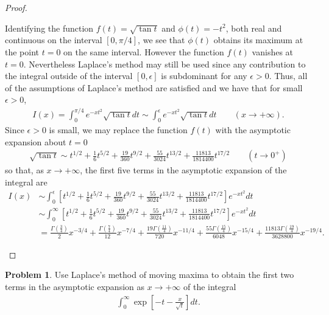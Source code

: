 \documentclass[12pt]{article}
\theoremstyle{definition}
\newtheorem{problem}{Problem}
\begin{document}
\begin{proof}
\begin{enumerate}
      Identifying the function $f(t) = \sqrt{\tan t}$ and $\phi(t) = -t^2$,
      both real and continuous on the interval $[0, \pi/4]$, we see that $\phi(t)$
      obtains its maximum at the point $t = 0$ on the same interval. However the function $f(t)$ vanishes at $t=0$.
      Nevertheless Laplace's method may still be used since any contribution to the
      integral outside of the interval $[0, \epsilon]$ is subdominant for any $\epsilon > 0$.
      Thus, all of the assumptions of Laplace's method are satisfied and we have that for small $\epsilon > 0$,
      \begin{align*}
        I(x) = \int_0^{\pi/4} e^{-xt^2}\sqrt{\tan t}   dt \sim \int_0^{\epsilon} e^{-xt^2}\sqrt{\tan t}   dt \qquad (x\to +\infty).
      \end{align*}
      Since $\epsilon > 0$ is small, we may replace the function $f(t)$ with the asymptotic expansion about $t=0$
      \begin{align*}
        \sqrt{\tan t} \sim t^{1/2} + \frac{1}{6}t^{5/2} + \frac{19}{360}t^{9/2} + \frac{55}{3024}t^{13/2} + \frac{11813}{1814400}t^{17/2} \qquad (t \to 0^+)
      \end{align*}
      so that, as $x \to +\infty$, the first five terms in the asymptotic expansion of the integral are
      \begin{align*}
        I(x) & \sim \int_0^\epsilon \left[t^{1/2} + \frac{1}{6}t^{5/2} + \frac{19}{360}t^{9/2} + \frac{55}{3024}t^{13/2} + \frac{11813}{1814400}t^{17/2}\right]e^{-xt^2}dt\\
        &\sim \int_0^\infty \left[t^{1/2} + \frac{1}{6}t^{5/2} + \frac{19}{360}t^{9/2} + \frac{55}{3024}t^{13/2} + \frac{11813}{1814400}t^{17/2}\right]e^{-xt^2}dt\\
        &= \frac{\Gamma\left(\frac{3}{4}\right)}{2}x^{-3/4} + \frac{\Gamma\left(\frac{7}{4}\right)}{12}x^{-7/4} + \frac{19\Gamma\left(\frac{11}{4}\right)}{720}x^{-11/4} + \frac{55\Gamma\left(\frac{15}{4}\right)}{6048} x^{-15/4} + \frac{11813\Gamma\left(\frac{19}{4}\right)}{3628800}x^{-19/4}.
      \end{align*}
  \end{enumerate}
\end{proof}
\newpage


\begin{problem}
  Use Laplace's method of moving maxima to obtain the first two terms in the asymptotic
  expansion as $x \to +\infty$ of the integral
  \begin{align}\label{exp_int}
    \int_{0}^\infty \exp\left[-t - \frac{x}{\sqrt{t}}\right] dt.
  \end{align}
\end{problem}
\end{document}
